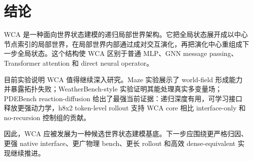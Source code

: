 \documentclass[11pt]{article}
\begin{document}
\section{结论}

WCA 是一种面向世界状态建模的递归局部世界架构。它把全局状态展开成以中心节点索引的局部世界，在局部世界内部通过成对交互演化，再把演化中心重组成下一步全局状态。这个结构使 WCA 区别于普通 MLP、GNN message passing、Transformer attention 和 direct neural operator。

目前实验说明 WCA 值得继续深入研究。Maze 实验展示了 world-field 形成能力并暴露拓扑失败；WeatherBench-style 实验证明其能处理真实多变量场；PDEBench reaction-diffusion 给出了最强当前证据：递归深度有用，可学习接口释放更强动力学，h8x2 token-level rollout 支持 WCA core 相比 interface-only 和 no-recursion 控制组的贡献。

因此，WCA 应被发展为一种候选世界状态建模基底。下一步应围绕更严格归因、更强 native interface、更广物理 bench、更长 rollout 和高效 dense-equivalent 实现继续推进。
\end{document}
